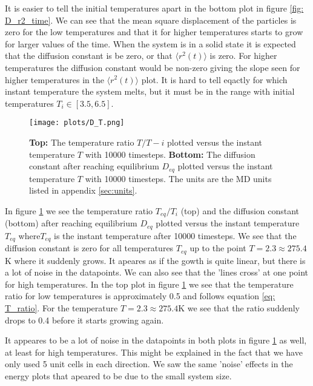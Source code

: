 \documentclass[11pt,a4wide]{article}
\begin{document}
It is easier to tell the initial temperatures apart in the bottom plot in figure \ref{fig: D_r2_time}. We can see that the mean square displacement of the particles is zero for the low temperatures and that it for higher temperatures starts to grow for larger values of the time. When the system is in a solid state it is expected that the diffusion constant is be zero, or that $\langle r^2(t) \rangle$ is zero. For higher temperatures the diffusion constant would be non-zero giving the slope seen for higher temperatures in the $\langle r^2(t) \rangle$ plot. It is hard to tell eqactly for which instant temperature the system melts, but it must be in the range with initial temperatures $T_i \in [3.5, 6.5]$.

\begin{figure}[htp]
\centering
\texttt{[image: plots/D\_T.png]}
\caption{\textbf{Top:} The temperature ratio $T/T-i$ plotted versus the instant temperature $T$ with 10000 timesteps. \textbf{Bottom:} The diffusion constant after reaching equilibrium $D_{eq}$ plotted versus the instant temperature $T$ with 10000 timesteps. The units are the MD units listed in appendix \ref{sec:units}.}
\label{fig: D_T}
\end{figure}

In figure \ref{fig: D_T} we see the temperature ratio $T_{eq}/T_i$ (top) and the diffusion constant (bottom) after reaching equilibrium $D_{eq}$ plotted versus the instant temperature $T_{eq}$ where$T_{eq}$ is the instant temperature after 10000 timesteps. We see that the diffusion constant is zero for all temperatures $T_{eq}$ up to the point $T = 2.3 \approx 275.4$K where it suddenly grows. It apeares as if the gowth is quite linear, but there is a lot of noise in the datapoints. We can also see that the 'lines cross' at one point for high temperatures. In the top plot in figure \ref{fig: D_T} we see that the temperature ratio for low temperatures is approximately 0.5 and follows equation \ref{eq: T_ratio}. For the temperature $T = 2.3 \approx 275.4$K we see that the ratio suddenly drops to 0.4 before it starts growing again. 

It appeares to be a lot of noise in the datapoints in both plots in figure \ref{fig: D_T} as well, at least for high temperatures. This might be explained in the fact that we have only used 5 unit cells in each direction. We saw the same 'noise' effects in the energy plots that apeared to be due to the small system size. 
\end{document}
